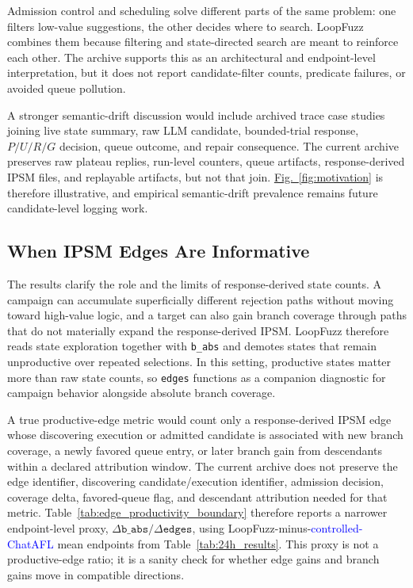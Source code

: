\documentclass[final,5p,times,number]{elsarticle}
\newcommand{\figref}[1]{\hyperref[#1]{Fig.~\ref*{#1}}}
\begin{document}
Admission control and scheduling solve different parts of the same problem: one filters low-value suggestions, the other decides where to search. LoopFuzz combines them because filtering and state-directed search are meant to reinforce each other. The archive supports this as an architectural and endpoint-level interpretation, but it does not report candidate-filter counts, predicate failures, or avoided queue pollution.

A stronger semantic-drift discussion would include archived trace case studies joining live state summary, raw LLM candidate, bounded-trial response, $P/U/R/G$ decision, queue outcome, and repair consequence. The current archive preserves raw plateau replies, run-level counters, queue artifacts, response-derived IPSM files, and replayable artifacts, but not that join. \figref{fig:motivation} is therefore illustrative, and empirical semantic-drift prevalence remains future candidate-level logging work.

\subsection{When IPSM Edges Are Informative}
\label{sec:ipsm_edges_informative}

The results clarify the role and the limits of response-derived state counts. A campaign can accumulate superficially different rejection paths without moving toward high-value logic, and a target can also gain branch coverage through paths that do not materially expand the response-derived IPSM. LoopFuzz therefore reads state exploration together with \texttt{b\_abs} and demotes states that remain unproductive over repeated selections. In this setting, productive states matter more than raw state counts, so \texttt{edges} functions as a companion diagnostic for campaign behavior alongside absolute branch coverage.

A true productive-edge metric would count only a response-derived IPSM edge whose discovering execution or admitted candidate is associated with new branch coverage, a newly favored queue entry, or later branch gain from descendants within a declared attribution window. The current archive does not preserve the edge identifier, discovering candidate/execution identifier, admission decision, coverage delta, favored-queue flag, and descendant attribution needed for that metric. Table~\ref{tab:edge_productivity_boundary} therefore reports a narrower endpoint-level proxy, $\Delta\texttt{b\_abs}/\Delta\texttt{edges}$, using LoopFuzz-minus-\textcolor{blue}{controlled-ChatAFL} mean endpoints from Table~\ref{tab:24h_results}. This proxy is not a productive-edge ratio; it is a sanity check for whether edge gains and branch gains move in compatible directions.
\end{document}
